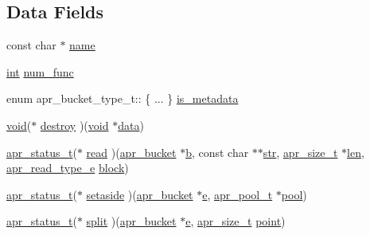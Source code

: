 \subsection*{Data Fields}
\begin{DoxyCompactItemize}
\item 
const char $\ast$ \hyperlink{structapr__bucket__type__t_ac6d779be45de214c6abd2cc205c48901}{name}
\item 
\hyperlink{pcre_8txt_a42dfa4ff673c82d8efe7144098fbc198}{int} \hyperlink{structapr__bucket__type__t_ad4bd2ffb03cb2f5f3b3941ce20468038}{num\+\_\+func}
\item 
enum apr\+\_\+bucket\+\_\+type\+\_\+t\+:: \{ ... \}  \hyperlink{structapr__bucket__type__t_a1a0d40943c081b8ea5f11810b66ae7b9}{is\+\_\+metadata}
\item 
\hyperlink{group__MOD__ISAPI_gacd6cdbf73df3d9eed42fa493d9b621a6}{void}($\ast$ \hyperlink{structapr__bucket__type__t_affe8b803b860b51d6ee86ff1c6d73d12}{destroy} )(\hyperlink{group__MOD__ISAPI_gacd6cdbf73df3d9eed42fa493d9b621a6}{void} $\ast$\hyperlink{structdata}{data})
\item 
\hyperlink{group__apr__errno_gaa5105fa83cc322f09382292db8b47593}{apr\+\_\+status\+\_\+t}($\ast$ \hyperlink{structapr__bucket__type__t_a4e6befb63427ae39290fe146b1b4e510}{read} )(\hyperlink{structapr__bucket}{apr\+\_\+bucket} $\ast$\hyperlink{group__APR__Util__Bucket__Brigades_ga11dc1bdeac74315dbed17465c98879e9}{b}, const char $\ast$$\ast$\hyperlink{group__APR__Util__Bucket__Brigades_ga6a62b60443be1d042194af15ce934193}{str}, \hyperlink{group__apr__platform_gaaa72b2253f6f3032cefea5712a27540e}{apr\+\_\+size\+\_\+t} $\ast$\hyperlink{group__APR__Util__XML_ga1e9401816e3a1cf930f448db46978ea7}{len}, \hyperlink{group__APR__Util__Bucket__Brigades_ga756973fb6392bd1026c3d96b4519776d}{apr\+\_\+read\+\_\+type\+\_\+e} \hyperlink{pcretest_8txt_aebde0006968e3c574305c604c927277a}{block})
\item 
\hyperlink{group__apr__errno_gaa5105fa83cc322f09382292db8b47593}{apr\+\_\+status\+\_\+t}($\ast$ \hyperlink{structapr__bucket__type__t_aee86765d7fdffddb1d98a45e968ee937}{setaside} )(\hyperlink{structapr__bucket}{apr\+\_\+bucket} $\ast$\hyperlink{pcregrep_8txt_acd90314acb2c2e5cd19681136c08efac}{e}, \hyperlink{structapr__pool__t}{apr\+\_\+pool\+\_\+t} $\ast$\hyperlink{group__APR__XLATE_gabb3cd978f04c73d0b763c391e9bfde73}{pool})
\item 
\hyperlink{group__apr__errno_gaa5105fa83cc322f09382292db8b47593}{apr\+\_\+status\+\_\+t}($\ast$ \hyperlink{structapr__bucket__type__t_a2281bf6b0c4538d29567fc7ddb1ad085}{split} )(\hyperlink{structapr__bucket}{apr\+\_\+bucket} $\ast$\hyperlink{pcregrep_8txt_acd90314acb2c2e5cd19681136c08efac}{e}, \hyperlink{group__apr__platform_gaaa72b2253f6f3032cefea5712a27540e}{apr\+\_\+size\+\_\+t} \hyperlink{group__APR__Util__Bucket__Brigades_gaa171c51f2fad7a4b51dcb4c4347c78a6}{point})
$$
\end{DoxyCompactItemize}

